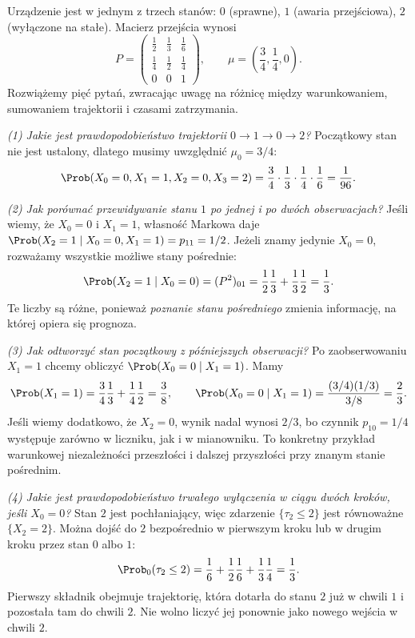 \begin{przyklad}
Urządzenie jest w jednym z trzech stanów:
$0$ (sprawne), $1$ (awaria przejściowa),
$2$ (wyłączone na stałe). Macierz przejścia wynosi
\[
P=\begin{pmatrix}
\frac12&\frac13&\frac16\\
\frac14&\frac12&\frac14\\
0&0&1
\end{pmatrix},
\qquad
\mu=\left(\frac34,\frac14,0\right).
\]
Rozwiążemy pięć pytań, zwracając uwagę na różnicę
między warunkowaniem, sumowaniem trajektorii
i czasami zatrzymania.

\emph{(1) Jakie jest prawdopodobieństwo trajektorii
$0\to1\to0\to2$?}
Początkowy stan nie jest ustalony, dlatego
musimy uwzględnić $\mu_0=3/4$:
\[
\Prob(X_0=0,X_1=1,X_2=0,X_3=2)
=\frac34\cdot\frac13\cdot\frac14\cdot\frac16
=\frac1{96}.
\]

\emph{(2) Jak porównać przewidywanie stanu $1$
po jednej i po dwóch obserwacjach?}
Jeśli wiemy, że $X_0=0$ i $X_1=1$, własność
Markowa daje
$\Prob(X_2=1\mid X_0=0,X_1=1)=p_{11}=1/2$.
Jeżeli znamy jedynie $X_0=0$, rozważamy wszystkie
możliwe stany pośrednie:
\[
\Prob(X_2=1\mid X_0=0)
=(P^2)_{01}=\frac12\frac13+\frac13\frac12=\frac13.
\]
Te liczby są różne, ponieważ \emph{poznanie stanu
pośredniego} zmienia informację, na której opiera się prognoza.

\emph{(3) Jak odtworzyć stan początkowy z późniejszych obserwacji?}
Po zaobserwowaniu $X_1=1$ chcemy obliczyć
$\Prob(X_0=0\mid X_1=1)$. Mamy
\[
\Prob(X_1=1)=\frac34\frac13+\frac14\frac12=\frac38,
\qquad
\Prob(X_0=0\mid X_1=1)
=\frac{(3/4)(1/3)}{3/8}=\frac23.
\]
Jeśli wiemy dodatkowo, że $X_2=0$, wynik nadal
wynosi $2/3$, bo czynnik $p_{10}=1/4$ występuje
zarówno w liczniku, jak i w mianowniku. To konkretny
przykład warunkowej niezależności przeszłości
i dalszej przyszłości przy znanym stanie pośrednim.

\emph{(4) Jakie jest prawdopodobieństwo trwałego
wyłączenia w ciągu dwóch kroków, jeśli $X_0=0$?}
Stan $2$ jest pochłaniający, więc zdarzenie
$\{\tau_2\leq2\}$ jest równoważne $\{X_2=2\}$.
Można dojść do $2$ bezpośrednio w pierwszym kroku
lub w drugim kroku przez stan $0$ albo $1$:
\[
\Prob_0(\tau_2\leq2)
=\frac16+\frac12\frac16+\frac13\frac14
=\frac13.
\]
Pierwszy składnik obejmuje trajektorię, która
dotarła do stanu $2$ już w chwili $1$ i pozostała tam
do chwili $2$. Nie wolno liczyć jej ponownie jako
nowego wejścia w chwili $2$.


\end{przyklad}
